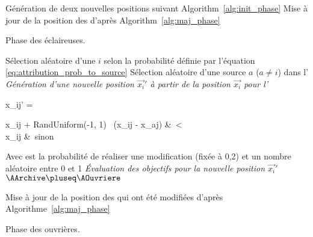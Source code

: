 \begin{algorithm}\label{alg:scout_phase}
  \SetAlgoVlined
  \DontPrintSemicolon
  {
    {
      Génération de deux nouvelles positions suivant Algorithm~\ref{alg:init_phase}\;
    }
  }
  Mise à jour de la position des \ASources d’après Algorithm~\ref{alg:maj_phase}\;
  \caption{Phase des éclaireuses.}
\end{algorithm}


\begin{algorithm}\label{alg:onlooker_phase}
  \SetAlgoVlined
  \DontPrintSemicolon
  \For{$\AOuvriere \in \AOnlookers$}
    {
      Sélection aléatoire d’une \ASource $i$ selon la probabilité
      définie par l’équation \eqref{eq:attribution_prob_to_source}\;
      Sélection aléatoire d’une source $a$ ($a \neq i$) dans l’\AArchive\;
       \emph{Génération d’une nouvelle position $\vec{x_{i}}'$ à partir de la
                         position $\vec{x_{i}}$ pour l’\AOuvriere }\;
      {
      \begin{algomathdisplay}
        x_{ij}' =%
          \begin{cases}
            x_{ij}  + RandUniform(-1, 1)   \times \ (x_{ij} - x_{aj}) &\ \ATirageB < \AMR \\
            x_{ij}                                                    &\ sinon
          \end{cases}
      \end{algomathdisplay}
      }
      \BlankLine
      Avec \AMR est la probabilité de réaliser une modification (fixée à 0,2) et
      \ATirageB un nombre aléatoire entre 0 et 1\;
      \BlankLine
       \emph{Évaluation des objectifs pour la nouvelle position $\vec{x_{i}}'$}\;
      \BlankLine
      {
        $\AArchive \pluseq \AOuvriere$ 
      }
    }

  Mise à jour de la position des \ASources qui ont été modifiées d’après Algorithme~\ref{alg:maj_phase}\;
  \caption{Phase des ouvrières.}
\end{algorithm}

